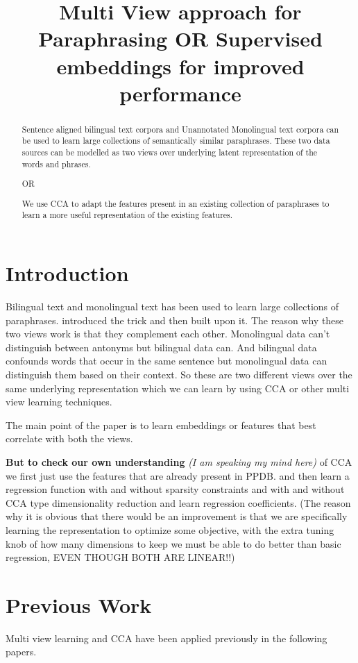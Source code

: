 \documentclass[11pt]{article}
\title{Multi View approach for Paraphrasing OR Supervised embeddings
  for improved performance}
\date{}
\begin{document}
\maketitle
\begin{abstract}
  Sentence aligned bilingual text corpora and Unannotated Monolingual
  text corpora can be used to learn large collections of semantically
  similar paraphrases. These two data sources can be modelled as two
  views over underlying latent representation of the words and
  phrases.

  OR
  
  We use CCA to adapt the features present in an existing collection
  of paraphrases to learn a more useful representation of the existing features.
\end{abstract}

\section{Introduction}
Bilingual text and monolingual text has been used to learn large
collections of paraphrases. \cite{bannard2005paraphrasing} introduced the trick and
then \cite{ganitkevitch2013ppdb} built upon it. The reason why these two views work is
that they complement each other. Monolingual data can't distinguish
between antonyms but bilingual data can. And bilingual data confounds
words that occur in the same sentence but monolingual data can
distinguish them based on their context. So these are two different
views over the same underlying representation which we can learn by
using CCA or other multi view learning techniques.

The main point of the paper is to learn embeddings or features
that best correlate with both the views. 

\textbf{But to check our own understanding} \textit{(I am speaking
  my mind here)} of CCA we first just use the
features that are already present in PPDB. and then learn a regression
function with and without sparsity constraints and with and without
CCA type dimensionality reduction and learn regression
coefficients. (The reason why it is obvious that there would be an
improvement is that we are specifically learning the representation to
optimize some objective, with the extra tuning knob of how many
dimensions to keep we must be able to do better than basic regression,
EVEN THOUGH BOTH ARE LINEAR!!)

\section{Previous Work}
Multi view learning and CCA have been applied previously in the following
papers.
\end{document}
